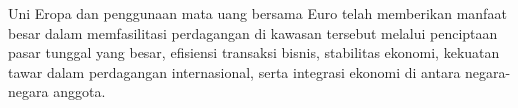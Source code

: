 \documentclass[12pt]{article}
\begin{document}
 Uni Eropa dan penggunaan mata uang bersama Euro telah memberikan manfaat besar dalam memfasilitasi perdagangan di kawasan tersebut melalui penciptaan pasar tunggal yang besar, efisiensi transaksi bisnis, stabilitas ekonomi, kekuatan tawar dalam perdagangan internasional, serta integrasi ekonomi di antara negara-negara anggota.





\printbibliography[title=Daftar Pustaka]
\end{document}

